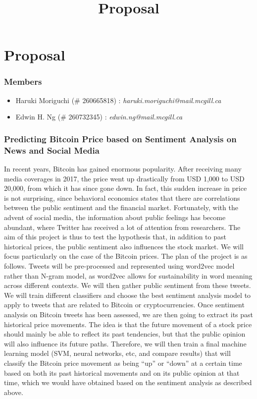\documentclass[12pt,a4paper]{report}
\begin{document}
\title{Proposal\\
}


\setcounter{page}{1}
\thispagestyle{empty} 


\chapter*{Proposal}
\subsection*{Members}
\begin{itemize}
\item Haruki Moriguchi (\# 260665818) : \textit{haruki.moriguchi@mail.mcgill.ca}
\item Edwin H. Ng (\# 260732345) : \textit{edwin.ng@mail.mcgill.ca}
\end{itemize}

\subsection*{Predicting Bitcoin Price based on Sentiment Analysis on News and Social Media}
\par \qquad In recent years, Bitcoin has gained enormous popularity. After receiving many media coverages in 2017, the price went up drastically from USD 1,000 to USD 20,000, from which it has since gone down. In fact, this sudden increase in price is not surprising, since behavioral economics states that there are correlations between the public sentiment and the financial market. Fortunately, with the advent of social media, the information about public feelings has become abundant, where Twitter has received a lot of attention from researchers. The aim of this project is thus to test the hypothesis that, in addition to past historical prices, the public sentiment also influences the stock market. We will focus particularly on the case of the Bitcoin prices. The plan of the project is as follows. Tweets will be pre-processed and represented using word2vec model rather than N-gram model, as word2vec allows for sustainability in word meaning across different contexts. We will then gather public sentiment from these tweets. We will train different classifiers and choose the best sentiment analysis model to apply to tweets that are related to Bitcoin or cryptocurrencies. Once sentiment analysis on Bitcoin tweets has been assessed, we are then going to extract its past historical price movements. The idea is that the future movement of a stock price should mainly be able to reflect its past tendencies, but that the public opinion will also influence its future paths. Therefore, we will then train a final machine learning model (SVM, neural networks, etc, and compare results) that will classify the Bitcoin price movement as being ``up'' or ``down'' at a certain time based on both its past historical movements and on its public opinion at that time, which we would have obtained based on the sentiment analysis as described above.
\\
\end{document}
